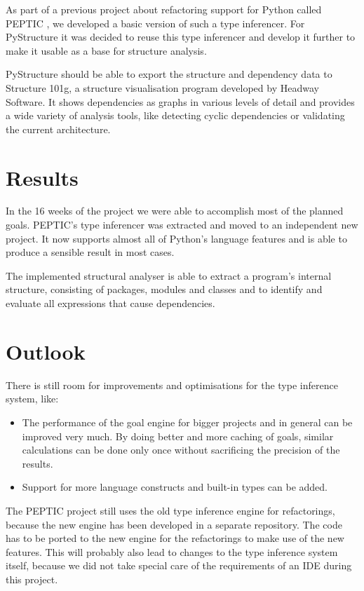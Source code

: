 \documentclass[12pt,halfparskip,DIV11,BCOR10mm]{scrreprt}
\begin{document}
As part of a previous project about refactoring support for Python called PEPTIC \cite{peptic2}, we developed a basic version of such a type inferencer. For PyStructure it was decided to reuse this type inferencer and develop it further to make it usable as a base for structure analysis.

PyStructure should be able to export the structure and dependency data to Structure 101g, a structure visualisation program developed by Headway Software. It shows dependencies as graphs in various levels of detail and provides a wide variety of analysis tools, like detecting cyclic dependencies or validating the current architecture.

\section*{Results}

In the 16 weeks of the project we were able to accomplish most of the planned goals. PEPTIC's type inferencer was extracted and moved to an independent new project. It now supports almost all of Python's language features and is able to produce a sensible result in most cases.

The implemented structural analyser is able to extract a program's internal structure, consisting of packages, modules and classes and to identify and evaluate all expressions that cause dependencies.

\section*{Outlook}

There is still room for improvements and optimisations for the type inference system, like:

\begin{itemize}
    \item The performance of the goal engine for bigger projects and in general can be improved very much. By doing better and more caching of goals, similar calculations can be done only once without sacrificing the precision of the results.
    \item Support for more language constructs and built-in types can be added.
\end{itemize}

The PEPTIC project still uses the old type inference engine for refactorings, because the new engine has been developed in a separate repository. The code has to be ported to the new engine for the refactorings to make use of the new features. This will probably also lead to changes to the type inference system itself, because we did not take special care of the requirements of an IDE during this project.
\end{document}
